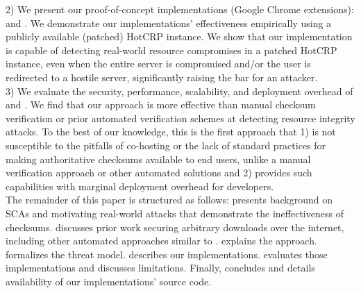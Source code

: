 2) We present our proof-of-concept \SYSTEM{} implementations (Google Chrome
extensions): \DNSSYS{} and \DHTSYS{}. We demonstrate our implementations'
effectiveness empirically using a publicly available (patched) HotCRP instance.
We show that our \DNSSYS{} implementation is capable of detecting real-world
resource compromises in a patched HotCRP instance, even when the entire server
is compromised and/or the user is redirected to a hostile server, significantly
raising the bar for an attacker. \\

3) We evaluate the security, performance, scalability, and deployment overhead
of \DNSSYS{} and \DHTSYS{}. We find that our approach is more effective than
manual checksum verification or prior automated verification schemes at
detecting resource integrity attacks. To the best of our knowledge, this is the
first approach that 1) is not susceptible to the pitfalls of co-hosting or the
lack of standard practices for making authoritative checksums available to end
users, unlike a manual verification approach or other automated solutions and 2)
provides such capabilities with marginal deployment overhead for developers. \\

The remainder of this paper is structured as follows: 
presents background on SCAs and motivating real-world attacks that demonstrate
the ineffectiveness of checksums.  discusses prior work securing
arbitrary downloads over the internet, including other automated approaches
similar to \SYSTEM{}.  explains the \SYSTEM{} approach.
 formalizes the threat model.  describes
our implementations.  evaluates those implementations and
discusses limitations. Finally,  concludes and
 details availability of our implementations' source code.
